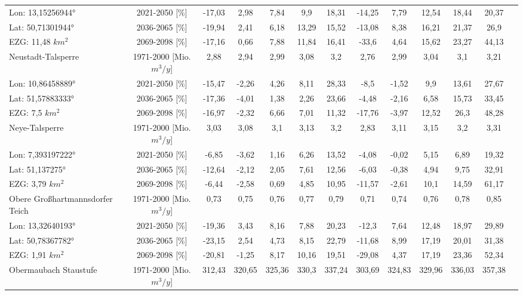 \begin{longtable}{@{\extracolsep{\fill}}lc|ccccc||cccccc}
\cline{2-13} 
Lon: 13,15256944° & 2021-2050 [\%]  & -17,03 & 2,98 & 7,84 & 9,9 & 18,31 & -14,25 & 7,79 & 12,54 & 18,44 & 20,37 & \\ 
Lat: 50,71301944° & 2036-2065 [\%]  & -19,94 & 2,41 & 6,18 & 13,29 & 15,52 & -13,08 & 8,38 & 16,21 & 21,37 & 26,9 & \\ 
EZG: 11,48 $km^2$ & 2069-2098 [\%]  & -17,16 & 0,66 & 7,88 & 11,84 & 16,41 & -33,6 & 4,64 & 15,62 & 23,27 & 44,13 & \\ 
\hline 
Neustadt-Talsperre & 1971-2000 [Mio. $m^3/y$]  & 2,88 & 2,94 & 2,99 & 3,08 & 3,2 & 2,76 & 2,99 & 3,04 & 3,1 & 3,21 & \\ 
\cline{2-13} 
Lon: 10,86458889° & 2021-2050 [\%]  & -15,47 & -2,26 & 4,26 & 8,11 & 28,33 & -8,5 & -1,52 & 9,9 & 13,61 & 27,67 & \\ 
Lat: 51,57883333° & 2036-2065 [\%]  & -17,36 & -4,01 & 1,38 & 2,26 & 23,66 & -4,48 & -2,16 & 6,58 & 15,73 & 33,45 & \\ 
EZG: 7,5 $km^2$ & 2069-2098 [\%]  & -16,97 & -2,32 & 6,66 & 7,01 & 11,32 & -17,76 & -3,97 & 12,52 & 26,3 & 48,28 & \\ 
\hline 
Neye-Talsperre & 1971-2000 [Mio. $m^3/y$]  & 3,03 & 3,08 & 3,1 & 3,13 & 3,2 & 2,83 & 3,11 & 3,15 & 3,2 & 3,31 & \\ 
\cline{2-13} 
Lon: 7,393197222° & 2021-2050 [\%]  & -6,85 & -3,62 & 1,16 & 6,26 & 13,52 & -4,08 & -0,02 & 5,15 & 6,89 & 19,32 & \\ 
Lat: 51,137275° & 2036-2065 [\%]  & -12,64 & -2,12 & 2,05 & 7,61 & 12,56 & -6,03 & -0,38 & 4,94 & 9,75 & 32,91 & \\ 
EZG: 3,79 $km^2$ & 2069-2098 [\%]  & -6,44 & -2,58 & 0,69 & 4,85 & 10,95 & -11,57 & -2,61 & 10,1 & 14,59 & 61,17 & \\ 
\hline 
Obere Großhartmannsdorfer Teich & 1971-2000 [Mio. $m^3/y$]  & 0,73 & 0,75 & 0,76 & 0,77 & 0,79 & 0,71 & 0,74 & 0,76 & 0,78 & 0,85 & \\ 
\cline{2-13} 
Lon: 13,32640193° & 2021-2050 [\%]  & -19,36 & 3,43 & 8,16 & 7,88 & 20,23 & -12,3 & 7,64 & 12,48 & 18,97 & 29,89 & \\ 
Lat: 50,78367782° & 2036-2065 [\%]  & -23,15 & 2,54 & 4,73 & 8,15 & 22,79 & -11,68 & 8,99 & 17,19 & 20,01 & 31,38 & \\ 
EZG: 1,91 $km^2$ & 2069-2098 [\%]  & -20,81 & -1,25 & 8,17 & 10,16 & 19,51 & -29,08 & 4,37 & 17,19 & 23,36 & 52,34 & \\ 
\hline 
Obermaubach Staustufe & 1971-2000 [Mio. $m^3/y$]  & 312,43 & 320,65 & 325,36 & 330,3 & 337,24 & 303,69 & 324,83 & 329,96 & 336,03 & 357,38 & \\ 

\end{longtable}
